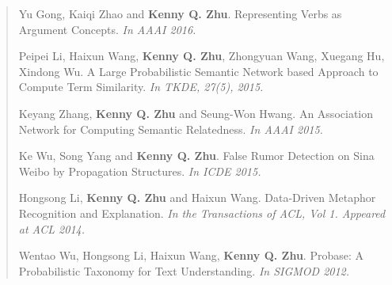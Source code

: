 \documentclass[10pt,a4paper]{article}
\begin{document}
\begin{quote}
Yu Gong, Kaiqi Zhao and {\bf Kenny Q. Zhu}. Representing Verbs as Argument Concepts.
{\it In AAAI 2016.}

Peipei Li, Haixun Wang, {\bf Kenny Q. Zhu}, Zhongyuan Wang, Xuegang Hu, Xindong Wu. A Large Probabilistic Semantic Network based Approach to Compute Term Similarity.
{\it In TKDE, 27(5), 2015.}

Keyang Zhang, {\bf Kenny Q. Zhu} and Seung-Won Hwang. An Association Network for Computing Semantic Relatedness. {\it In AAAI 2015.}

Ke Wu, Song Yang and {\bf Kenny Q. Zhu}. False Rumor Detection on Sina Weibo by Propagation Structures. {\it In ICDE 2015.}


Hongsong Li, {\bf Kenny Q. Zhu} and Haixun Wang.
Data-Driven Metaphor Recognition and Explanation.
{\it In the Transactions of ACL, Vol 1. Appeared at ACL 2014.}

%

%



Wentao Wu, Hongsong Li, Haixun Wang, {\bf Kenny Q. Zhu}.
Probase: A Probabilistic Taxonomy for Text Understanding.
{\it In SIGMOD 2012.}

%
%
%


\end{quote}
\end{document}
